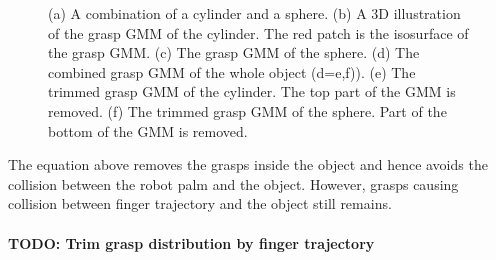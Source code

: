 \begin{figure}
\begin{minipage}[c]{1\textwidth}
    \end{minipage}

\caption{\scriptsize{(a) A combination of a cylinder and a sphere. (b) A 3D illustration of the grasp GMM of the cylinder. The red patch is the isosurface of the grasp GMM. (c) The grasp GMM of the sphere. (d) The combined grasp GMM of the whole object (d={e,f})). (e) The trimmed grasp GMM of the cylinder. The top part of the GMM is removed. (f) The trimmed grasp GMM of the sphere. Part of the bottom of the GMM is removed.}}
\label{fig:object}
\end{figure}


The equation above removes the grasps inside the object and hence avoids the collision between the robot palm and the object. However, grasps causing collision between finger trajectory and the object still remains.

\paragraph{TODO: Trim grasp distribution by finger trajectory} ~\\


